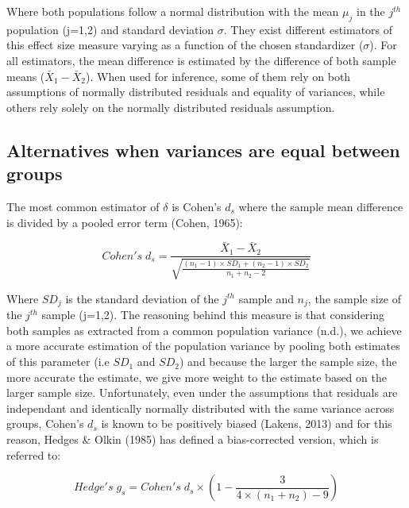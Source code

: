 \documentclass[
  man,floatsintext]{apa6}
\begin{document}
Where both populations follow a normal distribution with the mean \(\mu_j\) in the \(j^{th}\) population (j=1,2) and standard deviation \(\sigma\). They exist different estimators of this effect size measure varying as a function of the chosen standardizer (\(\sigma\)). For all estimators, the mean difference is estimated by the difference of both sample means (\(\bar{X}_1-\bar{X}_2\)). When used for inference, some of them rely on both assumptions of normally distributed residuals and equality of variances, while others rely solely on the normally distributed residuals assumption.

\hypertarget{alternatives-when-variances-are-equal-between-groups}{%
\subsection{Alternatives when variances are equal between groups}\label{alternatives-when-variances-are-equal-between-groups}}

The most common estimator of \(\delta\) is Cohen's \(d_{s}\) where the sample mean difference is divided by a pooled error term (Cohen, 1965):

\begin{equation} 
Cohen's \; d_s = \frac{\bar{X}_1-\bar{X}_2}{\sqrt{\frac{(n_1-1) \times SD_1+(n_2-1) \times SD_2}{n_1+n_2-2}}} 
\label{eq:Cohends}
\end{equation}

Where \(SD_j\) is the standard deviation of the \(j^{th}\) sample and \(n_j\), the sample size of the \(j^{th}\) sample (j=1,2). The reasoning behind this measure is that considering both samples as extracted from a common population variance (n.d.), we achieve a more accurate estimation of the population variance by pooling both estimates of this parameter (i.e \(SD_1\) and \(SD_2\)) and because the larger the sample size, the more accurate the estimate, we give more weight to the estimate based on the larger sample size. Unfortunately, even under the assumptions that residuals are independant and identically normally distributed with the same variance across groups, Cohen's \(d_s\) is known to be positively biased (Lakens, 2013) and for this reason, Hedges \& Olkin (1985) has defined a bias-corrected version, which is referred to:

\begin{equation} 
Hedge's \; g_s = Cohen's \; d_s \times (1-\frac{3}{4 \times (n_1+n_2)-9}) 
\label{eq:Hedgesgs}
\end{equation}
\end{document}
